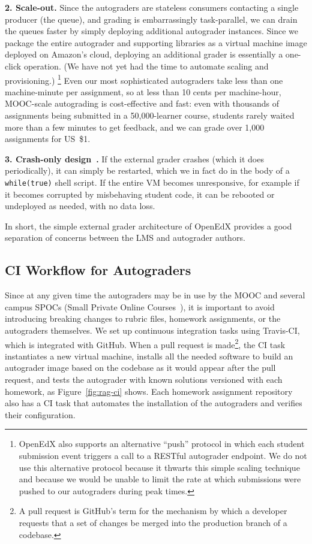 \noindent\textbf{2. Scale-out.} 
Since the autograders are stateless consumers
contacting a single producer (the queue), and grading is
embarrassingly task-parallel, we can drain the queues faster by simply
deploying additional autograder instances.
Since we package the entire autograder and supporting libraries as a
virtual machine image deployed on Amazon's cloud, deploying an
additional grader is essentially a one-click operation. (We have not
yet had the time to automate scaling and provisioning.)
\footnote{OpenEdX also supports an alternative ``push'' protocol in which each student
submission event triggers a call to a RESTful autograder endpoint.
We do not use this
alternative protocol because it thwarts this simple scaling technique
and because we would be  unable to limit the rate at which
submissions were pushed to our autograders during peak times.}
Even our most sophisticated autograders take less than one
machine-minute per assignment, so at less than 10 cents per machine-hour,
MOOC-scale 
autograding is cost-effective and fast: even with
thousands of assignments being submitted in a 50,000-learner course,
students rarely waited more than a few minutes to get feedback, and we
can grade over 1,000 assignments for US~\$1.

\noindent\textbf{3. Crash-only design~\cite{candea:crash-only}.}
If the external grader crashes (which it does periodically), it can
simply be restarted, which we in fact do in the
body of a \texttt{while(true)} shell script.
If the entire VM becomes unresponsive, for example if it becomes
corrupted by misbehaving student code, it can be rebooted or
undeployed as needed, with no data loss.

In short, the simple external grader architecture of OpenEdX provides a
good separation 
of concerns between the LMS and autograder authors.

\subsection{CI Workflow for Autograders}

Since at any given time the autograders
may be in use by the MOOC and several campus SPOCs (Small Private Online
Courses~\cite{spoc}), it is important to 
avoid introducing breaking changes to rubric files, homework
assignments, or the autograders themselves.
We set up continuous
integration tasks using Travis-CI, which is integrated with GitHub.
When a pull request is made\footnote{A pull request is
  GitHub's term for the mechanism by which a developer requests that a
  set of changes 
  be merged into the production branch of a codebase.},  
the CI task instantiates  a
new virtual 
machine, installs all the needed software to build an autograder image
based on the codebase as it would appear after the pull request,
and tests the autograder with known solutions versioned with each homework, as
Figure~\ref{fig:rag-ci} shows.
Each homework assignment repository also has a CI task that
automates the installation of the autograders and verifies their
configuration. 


